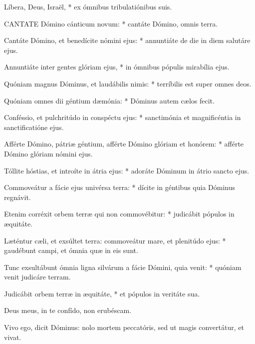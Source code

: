 Líbera, Deus, Israël, * ex ómnibus tribulatiónibus suis.



\lettrine[lines=2]{C}{ANTATE} Dómino cánticum novum: * cantáte Dómino, omnis terra.

Cantáte Dómino, et benedícite nómini ejus: * annuntiáte de die in diem salutáre ejus.

Annuntiáte inter gentes glóriam ejus, * in ómnibus pópulis mirabília ejus.

Quóniam magnus Dóminus, et laudábilis nimis: * terríbilis est super omnes deos.

Quóniam omnes dii géntium dæmónia: * Dóminus autem cælos fecit.

Conféssio, et pulchritúdo in conspéctu ejus: * sanctimónia et magnificéntia in sanctificatióne ejus.

Afférte Dómino, pátriæ géntium, afférte Dómino glóriam et honórem: * afférte Dómino glóriam nómini ejus.

Tóllite hóstias, et introíte in átria ejus: * adoráte Dóminum in átrio sancto ejus.

Commoveátur a fácie ejus univérsa terra: * dícite in géntibus quia Dóminus regnávit.

Etenim corréxit orbem terræ qui non commovébitur: * judicábit pópulos in æquitáte.

Læténtur cæli, et exsúltet terra: commoveátur mare, et plenitúdo ejus: * gaudébunt campi, et ómnia quæ in eis sunt.

Tunc exsultábunt ómnia ligna silvárum a fácie Dómini, quia venit: * quóniam venit judicáre terram.

Judicábit orbem terræ in æquitáte, * et pópulos in veritáte sua.


  Deus meus, in te confído, non erubéscam.



 Vivo ego, dicit Dóminus: nolo mortem peccatóris, sed ut magis convertátur, et vivat.


